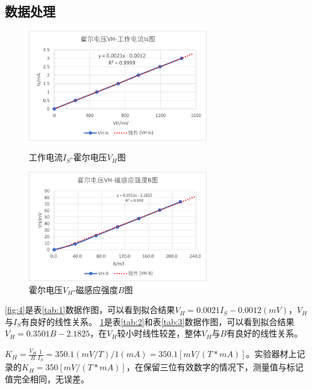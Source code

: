 \documentclass[11pt]{article}
\begin{document}
\subsection{数据处理}
\begin{figure}[H]
    \centering
    \begin{minipage}[t]{0.49\linewidth}
        \centering
        \includegraphics[width=7.8cm]{Fig/4.png}
        \caption{工作电流$I_S$-霍尔电压$V_H$图}
        \label{fig:4}
    \end{minipage}
    \begin{minipage}[t]{0.49\linewidth}
        \centering
        \includegraphics[width=7.8cm]{Fig/5.png}
        \caption{霍尔电压$V_H$-磁感应强度$B$图}
        \label{fig:5}
    \end{minipage}
    
\end{figure}
\par \cref{fig:4}是表\ref{tab:1}数据作图，可以看到拟合结果$V_H=0.0021I_S-0.0012(mV)$，$V_H$与$I_S$有良好的线性关系。
     \cref{fig:5}是表\ref{tab:2}和表\ref{tab:3}数据作图，可以看到拟合结果$V_H=0.3501B-2.1825$，在$V_H$较小时线性较差，整体$V_H$与$B$有良好的线性关系。
\par $K_H=\frac{V_H}{B}\frac{1}{I_S}=350.1(mV/T)/1(mA)=350.1\left[mV/(T*mA)\right]$。实验器材上记录的$K_H=350\left[mV/(T*mA)\right]$，在保留三位有效数字的情况下，测量值与标记值完全相同，无误差。
\end{document}
